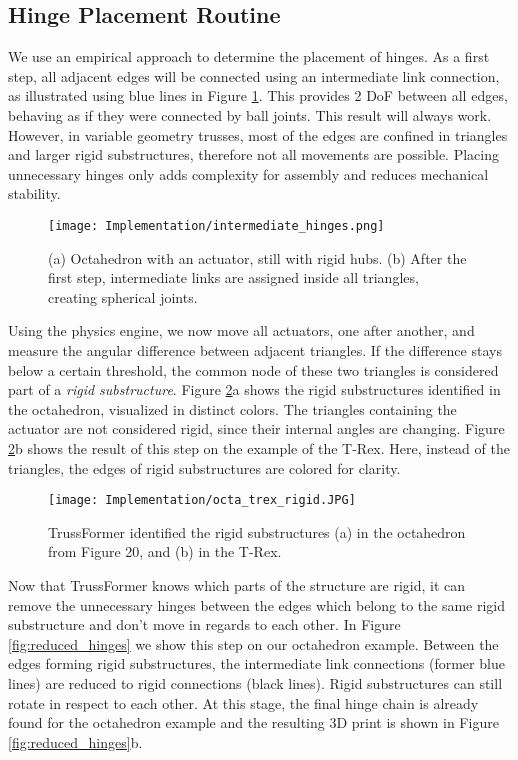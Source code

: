 \subsection{Hinge Placement Routine}\label{sec:hinge_placement_impl}
We use an empirical approach to determine the placement of hinges. As a first step, all adjacent edges will be connected using an intermediate link connection, as illustrated using blue lines in Figure \ref{fig:intermediate_hinges}. This provides 2 DoF between all edges, behaving as if they were connected by ball joints. This result will always work. However, in variable geometry trusses, most of the edges are confined in triangles and larger rigid substructures, therefore not all movements are possible. Placing unnecessary hinges only adds complexity for assembly and reduces mechanical stability.\\
\begin{figure}[ht!]
    \texttt{[image: Implementation/intermediate\_hinges.png]}
    \centering
    \caption{(a) Octahedron with an actuator, still with rigid hubs. (b) After the first step, intermediate links are assigned inside all triangles, creating spherical joints.}
    \label{fig:intermediate_hinges}
\end{figure}
Using the physics engine, we now move all actuators, one after another, and measure the angular difference between adjacent triangles. If the difference stays below a certain threshold, the common node of these two triangles is considered part of a \textit{rigid substructure}. Figure \ref{fig:static_substructure}a shows the rigid substructures identified in the octahedron, visualized in distinct colors. The triangles containing the actuator are not considered rigid, since their internal angles are changing. Figure \ref{fig:static_substructure}b shows the result of this step on the example of the T-Rex. Here, instead of the triangles, the edges of rigid substructures are colored for clarity.\\
\begin{figure}[ht!]
    \texttt{[image: Implementation/octa\_trex\_rigid.JPG]}
    \centering
    \caption{TrussFormer identified the rigid substructures (a) in the octahedron from Figure 20, and (b) in the T-Rex.}
    \label{fig:static_substructure}
\end{figure}
Now that TrussFormer knows which parts of the structure are rigid, it can remove the unnecessary hinges between the edges which belong to the same rigid substructure and don’t move in regards to each other. In Figure \ref{fig:reduced_hinges} we show this step on our octahedron example. Between the edges forming rigid substructures, the intermediate link connections (former blue lines) are reduced to rigid connections (black lines). Rigid substructures can still rotate in respect to each other. At this stage, the final hinge chain is already found for the octahedron example and the resulting 3D print is shown in Figure \ref{fig:reduced_hinges}b.
